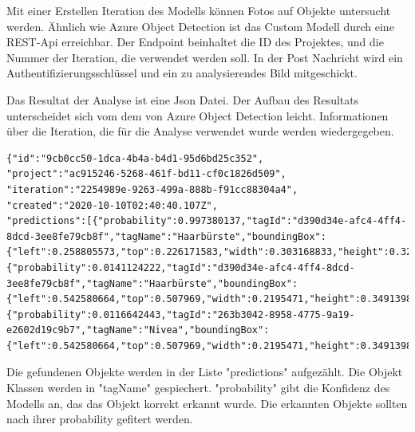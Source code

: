 Mit einer Erstellen Iteration des Modells können Fotos auf Objekte untersucht werden. Ähnlich wie Azure Object Detection ist das Custom Modell durch eine REST-Api erreichbar. 
Der Endpoint beinhaltet die ID des Projektes, und die Nummer der Iteration, die verwendet werden soll.
In der Post Nachricht wird ein Authentifizierungsschlüssel und ein zu analysierendes Bild mitgeschickt.

Das Resultat der Analyse ist eine Json Datei. 
Der Aufbau des Resultats unterscheidet sich vom dem von Azure Object Detection leicht. Informationen über die Iteration, die für die Analyse verwendet wurde werden wiedergegeben. 

\begin{lstlisting}
{"id":"9cb0cc50-1dca-4b4a-b4d1-95d6bd25c352",
"project":"ac915246-5268-461f-bd11-cf0c1826d509",
"iteration":"2254989e-9263-499a-888b-f91cc88304a4",
"created":"2020-10-10T02:40:40.107Z",
"predictions":[{"probability":0.997380137,"tagId":"d390d34e-afc4-4ff4-8dcd-3ee8fe79cb8f","tagName":"Haarbürste","boundingBox":{"left":0.258805573,"top":0.226171583,"width":0.303168833,"height":0.329167157}},
{"probability":0.0141124222,"tagId":"d390d34e-afc4-4ff4-8dcd-3ee8fe79cb8f","tagName":"Haarbürste","boundingBox":{"left":0.542580664,"top":0.507969,"width":0.2195471,"height":0.3491398}},
{"probability":0.0116642443,"tagId":"263b3042-8958-4775-9a19-e2602d19c9b7","tagName":"Nivea","boundingBox":{"left":0.542580664,"top":0.507969,"width":0.2195471,"height":0.3491398}}]}
\end{lstlisting}

Die gefundenen Objekte werden in der Liste "predictions" aufgezählt. Die Objekt Klassen werden in "tagName" gespiechert. "probability" gibt die Konfidenz des Modells an, das das Objekt korrekt erkannt wurde. Die erkannten Objekte sollten nach ihrer probability gefitert werden.



